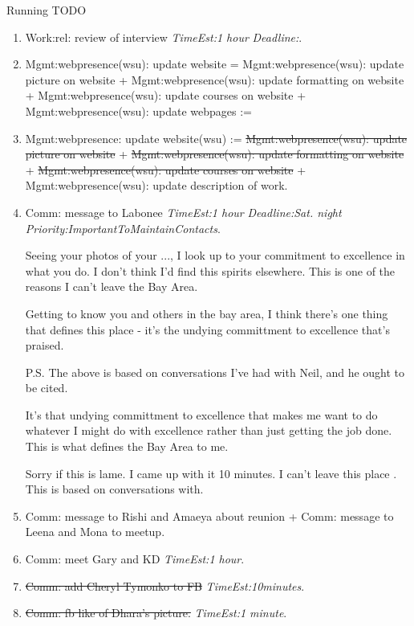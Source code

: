 \documentclass[serif, mathserif, final]{beamer}
\newcommand{\doneTaskNoItem}[1]{\sout{#1}}
\newcommand{\doneTask}[1]{\tiny \item \tiny \sout{#1}}
\newcommand{\te}[1]{\textit{TimeEst:}\textit{#1}}
\newcommand{\dl}[1]{\textit{Deadline:}\textit{#1}}
\newcommand{\pr}[1]{\textit{Priority:}\textit{#1}}
\begin{document}
\begin{frame}
\begin{columns}
\begin{column}{0.5\linewidth}
\begin{block}{Running TODO}
\begin{enumerate}
        \item \tiny Work:rel: review of interview \te{1 hour} \dl{}.

        \item \tiny Mgmt:webpresence(wsu): update website = 
          Mgmt:webpresence(wsu): update picture on website  +
          Mgmt:webpresence(wsu): update formatting on website +
          Mgmt:webpresence(wsu): update courses on website +
          Mgmt:webpresence(wsu): update webpages := 
        \item \tiny Mgmt:webpresence: update website(wsu) :=
          \doneTaskNoItem{Mgmt:webpresence(wsu): update picture on website}  +
          \doneTaskNoItem{Mgmt:webpresence(wsu): update formatting on
            website} + \doneTaskNoItem{Mgmt:webpresence(wsu): update
            courses on website} + Mgmt:webpresence(wsu): update
          description of work. 


        \item \tiny Comm: message to Labonee \te{1 hour} 
          \dl{Sat. night} \pr{ImportantToMaintainContacts}. 

        Seeing your photos of your ..., I look up to your commitment to
        excellence in what you do.  I don't think I'd find this
        spirits elsewhere. This is one of the reasons I can't leave the Bay
        Area. 

        Getting to know you and others in the bay area, I think
        there's one thing that defines this place - it's the undying
        committment to excellence that's praised. 

        P.S. The above is based on conversations I've had with Neil,
        and he ought to be cited. 

        It's that undying committment to excellence that makes me
        want to do whatever I might do with excellence rather than
        just getting the job done. This is what defines the Bay Area
        to me. 
        
        Sorry if this is lame. I came up with it 10 minutes. I can't leave
        this place . This is based on conversations with.

        \item \tiny Comm: message to Rishi and Amaeya about reunion +
          Comm: message to Leena and Mona to meetup. 


        \item \tiny Comm: meet Gary and KD \te{1 hour}. \doneTask{Comm: add Cheryl Tymonko to FB} \te{10minutes}. \doneTask{Comm: fb like of Dhara's picture.}
          \te{1 minute}. 


\end{enumerate}
\end{block}
\end{column}
\end{columns}
\end{frame}
\end{document}

